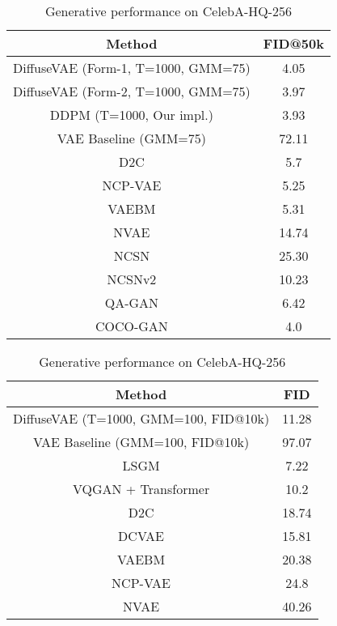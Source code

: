 \documentclass[10pt]{article} \usepackage[accepted]{tmlr}
\begin{document}
\begin{table}[]
\scriptsize
\centering
\begin{minipage}{0.49\linewidth}
\centering
\begin{tabular}{@{}cc@{}}
\toprule
\textbf{Method}                      & \textbf{FID@50k}           \\ \midrule
DiffuseVAE (Form-1, T=1000, GMM=75) & 4.05 \\
DiffuseVAE (Form-2, T=1000, GMM=75) & 3.97 \\
DDPM (T=1000, Our impl.)    & 3.93          \\
VAE Baseline (GMM=75)                & 72.11         \\ \midrule
D2C \citep{sinha2021d2c}                         & 5.7           \\
NCP-VAE \citep{Aneja2020NCPVAEVA}                     & 5.25          \\
VAEBM \citep{xiao2021vaebm}                       & 5.31          \\
NVAE \citep{vahdat2021nvae}                        & 14.74         \\
NCSN \citep{song2020generative}                    & 25.30         \\
NCSNv2 \citep{song2020improved}                     & 10.23         \\
QA-GAN  \citep{NEURIPS2019_b59a51a3}                    & 6.42          \\
COCO-GAN  \citep{lin2020cocogan}                  & 4.0           \\ \bottomrule
\end{tabular}
\caption{Generative performance on CelebA-64}
\label{table:celeba64_sota}
\end{minipage}
\hfill
\begin{minipage}{0.49\linewidth}
\centering
\begin{tabular}{@{}cc@{}}
\toprule
\textbf{Method}              & \textbf{FID}  \\ \midrule
DiffuseVAE (T=1000, GMM=100, FID@10k) &  11.28              \\
VAE Baseline (GMM=100, FID@10k)       &     97.07             \\ \midrule
LSGM \citep{vahdat2021scorebased}                        & 7.22             \\
VQGAN + Transformer \citep{https://doi.org/10.48550/arxiv.2012.09841}          & 10.2             \\
D2C \citep{sinha2021d2c}                          & 18.74            \\
DCVAE \citep{parmar2021dual}                       & 15.81            \\
VAEBM \citep{xiao2021vaebm}                        & 20.38            \\
NCP-VAE \citep{Aneja2020NCPVAEVA}                     & 24.8             \\
NVAE \citep{vahdat2021nvae}                         & 40.26            \\ \bottomrule
\end{tabular}
\caption{Generative performance on CelebA-HQ-256}
\label{table:celebahq_sota}
\end{minipage}
\end{table}
\end{document}
